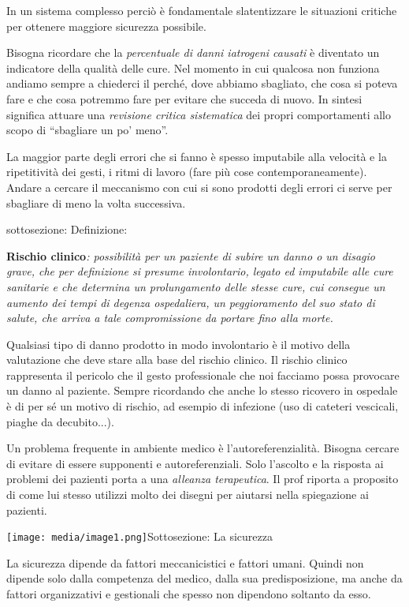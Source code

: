 \documentclass[]{article}
\begin{document}
In un sistema complesso perciò è fondamentale slatentizzare le
situazioni critiche per ottenere maggiore sicurezza possibile.

Bisogna ricordare che la \emph{percentuale di danni iatrogeni causati} è
diventato un indicatore della qualità delle cure. Nel momento in cui
qualcosa non funziona andiamo sempre a chiederci il perché, dove abbiamo
sbagliato, che cosa si poteva fare e che cosa potremmo fare per evitare
che succeda di nuovo. In sintesi significa attuare una \emph{revisione
critica sistematica} dei propri comportamenti allo scopo di ``sbagliare
un po' meno''.

La maggior parte degli errori che si fanno è spesso imputabile alla
velocità e la ripetitività dei gesti, i ritmi di lavoro (fare più cose
contemporaneamente). Andare a cercare il meccanismo con cui si sono
prodotti degli errori ci serve per sbagliare di meno la volta
successiva.

sottosezione: Definizione:

\textbf{Rischio clinico}\emph{: possibilità per un paziente di subire un
danno o un disagio grave, che per definizione si presume involontario,
legato ed imputabile alle cure sanitarie e che determina un
prolungamento delle stesse cure, cui consegue un aumento dei tempi di
degenza ospedaliera, un peggioramento del suo stato di salute, che
arriva a tale compromissione da portare fino alla morte.}

Qualsiasi tipo di danno prodotto in modo involontario è il motivo della
valutazione che deve stare alla base del rischio clinico. Il rischio
clinico rappresenta il pericolo che il gesto professionale che noi
facciamo possa provocare un danno al paziente. Sempre ricordando che
anche lo stesso ricovero in ospedale è di per sé un motivo di rischio,
ad esempio di infezione (uso di cateteri vescicali, piaghe da
decubito...).

Un problema frequente in ambiente medico è l'autoreferenzialità. Bisogna
cercare di evitare di essere supponenti e autoreferenziali. Solo
l'ascolto e la risposta ai problemi dei pazienti porta a una
\emph{alleanza terapeutica}. Il prof riporta a proposito di come lui
stesso utilizzi molto dei disegni per aiutarsi nella spiegazione ai
pazienti.

\texttt{[image: media/image1.png]}Sottosezione:
La sicurezza

La sicurezza dipende da fattori meccanicistici e fattori umani. Quindi
non dipende solo dalla competenza del medico, dalla sua predisposizione,
ma anche da fattori organizzativi e gestionali che spesso non dipendono
soltanto da esso.
\end{document}
